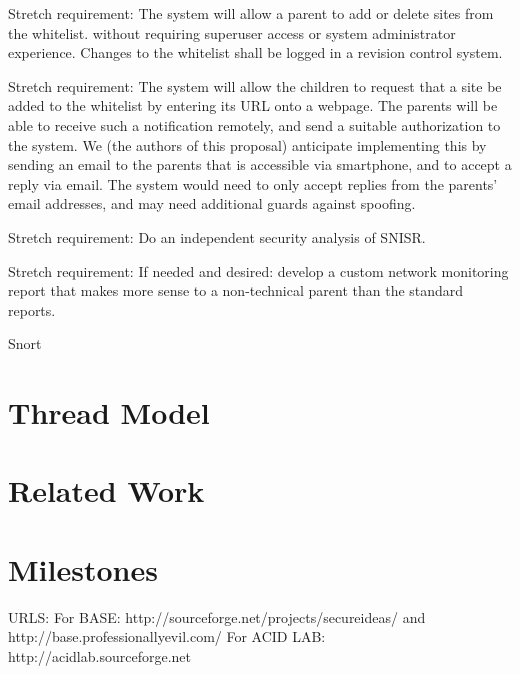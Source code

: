 \documentclass[12pt] {article}
\begin{document}
Stretch requirement: The system will allow a parent to add or delete sites
from the whitelist. without requiring superuser access or system
administrator experience.  Changes to the whitelist shall be logged in a
revision control system.

Stretch requirement: The system will allow the children to request that a
site be added to the whitelist by entering its URL onto a webpage.  The
parents will be able to receive such a notification remotely, and send a
suitable authorization to the system.  We (the authors of this proposal)
anticipate implementing this by sending an email to the parents that is
accessible via smartphone, and to accept a reply via email.  The system
would need to only accept replies from the parents' email addresses, and may
need additional guards against spoofing.

Stretch requirement: Do an independent security analysis of SNISR.

Stretch requirement: If needed and desired: develop a custom network
monitoring report that makes more sense to a non-technical parent than the
standard reports.

Snort\cite{snort}

\section*{Thread Model}

\section*{Related Work}

\section*{Milestones}

URLS:
For BASE: http://sourceforge.net/projects/secureideas/
        and http://base.professionallyevil.com/
For ACID LAB: http://acidlab.sourceforge.net

{
  
  
}
\end{document}
